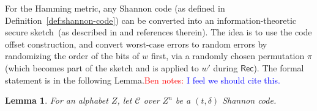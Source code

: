 \documentclass[11pt]{article}
\newcommand{\class}[1]{{\ensuremath{\mathsf{#1}}}}
\newcommand{\sketch}{\ensuremath{\class{SS}}\xspace}
\newcommand{\rec}{\ensuremath{\class{Rec}}\xspace}
\newcommand{\Hoo}{\mathrm{H}_\infty}
\newtheorem{lemma}[theorem]{Lemma}
\newcommand{\authnote}[2]{{\textcolor{red}{\textsf{#1 notes: }\textcolor{blue}{ #2}}\marginpar{\textcolor{red}{\textbf{!!!!!}}}}}
\newcommand{\authnote}[2]{}
\newcommand{\bnote}[1]{{\authnote{Ben}{#1}}}
\newcommand{\lnote}[1]{{\authnote{Leo}{#1}}}
\begin{document}
For the Hamming metric, any Shannon code (as defined in Definition~\ref{def:shannon-code}) can be converted into an information-theoretic secure sketch~(as described in \cite[Section 8.2]{DBLP:journals/siamcomp/DodisORS08} and references therein).  The idea is to use the code offset construction, and convert worst-case errors to random errors by randomizing the order of the bits of $w$ first, via a randomly chosen  permutation $\pi$  (which  becomes part of the sketch and is applied to $w'$ during $\rec$). The formal statement is in the following Lemma.\bnote{I feel we should cite this.}
\begin{lemma}
\label{lem:shannon to sketch}
For an alphabet $Z$, let $\mathcal{C}$ over $Z^n$ be a $(t, \delta)$ Shannon code.  %
%

\end{lemma}
\end{document}
